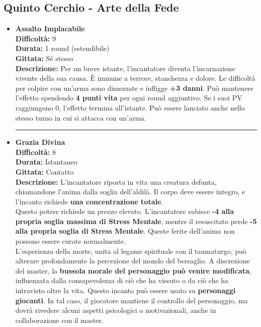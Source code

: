\documentclass[../manuale_main.tex]{subfiles}
\begin{document}
 \subsection*{Quinto Cerchio - Arte della Fede}

\begin{itemize}

\item \textbf{Assalto Implacabile} \\
\textbf{Difficoltà:} 9 \\
\textbf{Durata:} 1 round (estendibile) \\
\textbf{Gittata:} Sé stesso \\
\textbf{Descrizione:} Per un breve istante, l’incantatore diventa l’incarnazione vivente della sua causa. È immune a terrore, stanchezza e dolore. Le difficoltà per colpire con un’arma sono dimezzate e infligge \textbf{+3 danni}. Può mantenere l'effetto spendendo \textbf{4 punti vita} per ogni round aggiuntivo. Se i suoi PV raggiungono 0, l’effetto termina all’istante. Può essere lanciato anche nello stesso turno in cui si attacca con un'arma.

\vspace{0.5cm}\rule{\textwidth}{0.4pt}\vspace{1cm}
\clearpage

\item \textbf{Grazia Divina} \\
\textbf{Difficoltà:} 8 \\
\textbf{Durata:} Istantaneo \\
\textbf{Gittata:} Contatto \\
\textbf{Descrizione:} L'incantatore riporta in vita una creatura defunta, chiamandone l’anima dalla soglia dell’aldilà. Il corpo deve essere integro, e l’incanto richiede \textbf{una concentrazione totale}.\\

Questo potere richiede un prezzo elevato. L'incantatore subisce \textbf{-4 alla propria soglia massima di Stress Mentale}, mentre il resuscitato perde \textbf{-5 alla propria soglia di Stress Mentale}. Queste ferite dell’anima non possono essere curate normalmente.\\

L’esperienza della morte, unita al legame spirituale con il taumaturgo, può alterare profondamente la percezione del mondo del bersaglio. A discrezione del master, la \textbf{bussola morale del personaggio può venire modificata}, influenzata dalla consapevolezza di ciò che ha vissuto o da ciò che ha intravisto oltre la vita.
Questo incanto può essere usato su \textbf{personaggi giocanti}. In tal caso, il giocatore mantiene il controllo del personaggio, ma dovrà rivedere alcuni aspetti psicologici o motivazionali, anche in collaborazione con il master.


\end{itemize}
\end{document}
